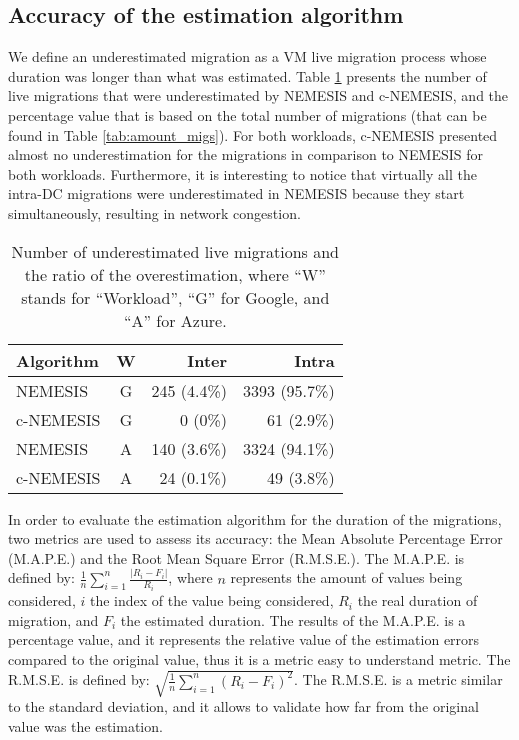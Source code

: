  \subsection{Accuracy of the estimation algorithm}
 
We define an underestimated migration as a VM live migration process whose duration was longer than what was estimated. Table \ref{tab:migs_under} presents the number of live migrations that were underestimated by NEMESIS and c-NEMESIS, and the percentage value that is based on the total number of migrations (that can be found in Table \ref{tab:amount_migs}). For both workloads, c-NEMESIS presented almost no underestimation for the migrations in comparison to NEMESIS for both workloads. Furthermore, it is interesting to notice that virtually all the intra-DC migrations were underestimated in NEMESIS because they start simultaneously, resulting in network congestion.

\begin{table}[!ht]
\caption{Number of underestimated live migrations and the ratio of the overestimation, where ``W'' stands for ``Workload'', ``G'' for Google, and ``A'' for Azure.}\label{tab:migs_under} \centering
\begin{tabular}{|l|c|r|r|}
  \hline
  \textbf{Algorithm} & \textbf{W}  & \textbf{Inter} & \textbf{Intra}   \\
  \hline
  NEMESIS  & G & 245 (4.4\%)   & 3393 (95.7\%) \\
  \hline
  c-NEMESIS & G & 0 (0\%)  & 61 (2.9\%) \\
  \hline
  NEMESIS & A & 140 (3.6\%)   &  3324 (94.1\%)   \\
  \hline
  c-NEMESIS & A & 24 (0.1\%)   & 49 (3.8\%) \\
  \hline  
\end{tabular}
\end{table}


In order to evaluate the estimation algorithm for the duration of the migrations, two metrics are used to assess its accuracy: the Mean Absolute Percentage Error (M.A.P.E.) and the Root Mean Square Error (R.M.S.E.). The M.A.P.E. is defined by: $ \frac{1}{n}\sum_{i=1}^{n}  \frac{| R_{i} - F_{i}|}{R_{i}}$, where $n$ represents the amount of values being considered, $i$ the index of the value being considered, $R_{i}$ the real duration of migration, and $F_{i}$ the estimated duration. The results of the M.A.P.E. is a percentage value, and it represents the relative value of the estimation errors compared to the original value, thus it is a metric easy to understand metric. The R.M.S.E. is defined by: $\sqrt{ \frac{1}{n}\sum_{i=1}^{n}  (R_{i} - F_{i})^2}$. The R.M.S.E. is a metric similar to the standard deviation, and it allows to validate how far from the original value was the estimation.



